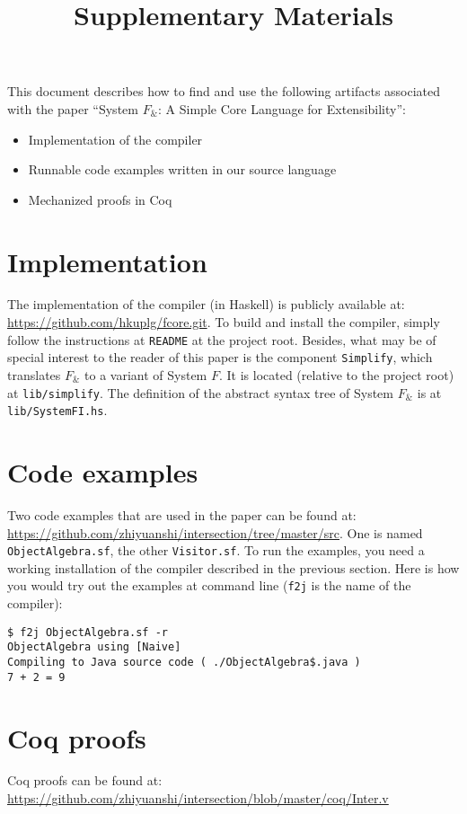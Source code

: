 \documentclass{article}
\begin{document}
\title{Supplementary Materials}
\maketitle

This document describes how to find and use the following artifacts associated
with the paper ``System $F_\&$: A Simple Core Language for Extensibility'':

\begin{itemize}
  \item Implementation of the compiler
  \item Runnable code examples written in our source language
  \item Mechanized proofs in Coq
\end{itemize}

\section*{Implementation}

The implementation of the compiler (in Haskell) is publicly available at:
\url{https://github.com/hkuplg/fcore.git}. To build and install the compiler,
simply follow the instructions at \texttt{README} at the project root. Besides,
what may be of special interest to the reader of this paper is the component
\texttt{Simplify}, which translates $ F_\&$ to a variant of System $F$. It is
located (relative to the project root) at \texttt{lib/simplify}. The definition
of the abstract syntax tree of System $F_\&$ is at \texttt{lib/SystemFI.hs}.

\section*{Code examples}

Two code examples that are used in the paper can be found at:
\url{https://github.com/zhiyuanshi/intersection/tree/master/src}. One is named
\texttt{ObjectAlgebra.sf}, the other \texttt{Visitor.sf}. To run the examples,
you need a working installation of the compiler described in the previous
section. Here is how you would try out the examples at command line
(\texttt{f2j} is the name of the compiler):
\begin{lstlisting}
$ f2j ObjectAlgebra.sf -r
ObjectAlgebra using [Naive]
Compiling to Java source code ( ./ObjectAlgebra$.java )
7 + 2 = 9
\end{lstlisting}

\section*{Coq proofs}

Coq proofs can be found at:
\url{https://github.com/zhiyuanshi/intersection/blob/master/coq/Inter.v}
\end{document}

